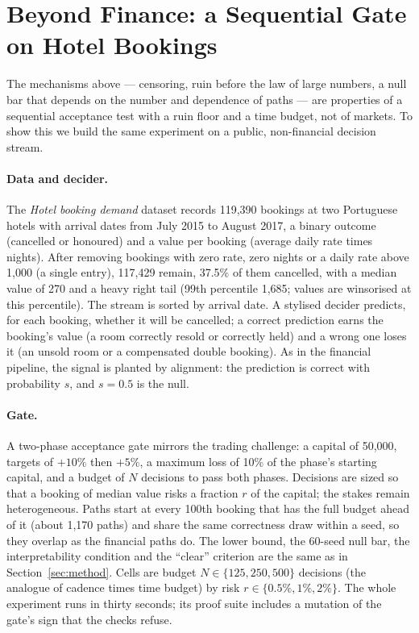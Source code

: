 \documentclass[11pt]{article}
\begin{document}
\section{Beyond Finance: a Sequential Gate on Hotel Bookings}
\label{sec:beyond}

The mechanisms above --- censoring, ruin before the law of large numbers, a null bar that depends on the number and dependence of paths --- are properties of a sequential acceptance test with a ruin floor and a time budget, not of markets. To show this we build the same experiment on a public, non-financial decision stream.

\paragraph{Data and decider.}
The \emph{Hotel booking demand} dataset \citep{antonio2019} records 119,390 bookings at two Portuguese hotels with arrival dates from July 2015 to August 2017, a binary outcome (cancelled or honoured) and a value per booking (average daily rate times nights). After removing bookings with zero rate, zero nights or a daily rate above 1,000 (a single entry), 117,429 remain, 37.5\% of them cancelled, with a median value of 270 and a heavy right tail (99th percentile 1,685; values are winsorised at this percentile). The stream is sorted by arrival date. A stylised decider predicts, for each booking, whether it will be cancelled; a correct prediction earns the booking's value (a room correctly resold or correctly held) and a wrong one loses it (an unsold room or a compensated double booking). As in the financial pipeline, the signal is planted by alignment: the prediction is correct with probability $s$, and $s = 0.5$ is the null.

\paragraph{Gate.}
A two-phase acceptance gate mirrors the trading challenge: a capital of 50,000, targets of $+10\%$ then $+5\%$, a maximum loss of 10\% of the phase's starting capital, and a budget of $N$ decisions to pass both phases. Decisions are sized so that a booking of median value risks a fraction $r$ of the capital; the stakes remain heterogeneous. Paths start at every 100th booking that has the full budget ahead of it (about 1,170 paths) and share the same correctness draw within a seed, so they overlap as the financial paths do. The lower bound, the 60-seed null bar, the interpretability condition and the ``clear'' criterion are the same as in Section~\ref{sec:method}. Cells are budget $N \in \{125, 250, 500\}$ decisions (the analogue of cadence times time budget) by risk $r \in \{0.5\%, 1\%, 2\%\}$. The whole experiment runs in thirty seconds; its proof suite includes a mutation of the gate's sign that the checks refuse.
\end{document}
